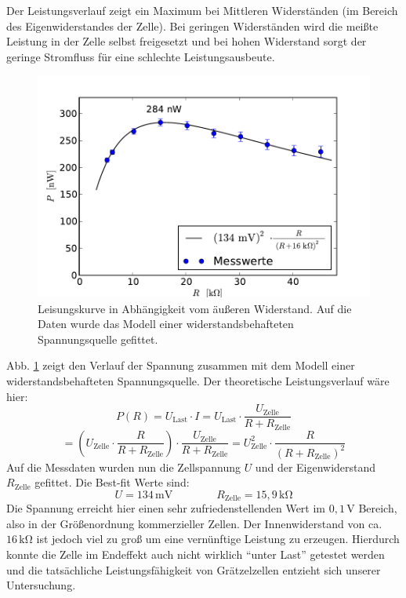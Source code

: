 \documentclass[11pt]{scrartcl}
\newcommand{\unit}[1]{\ensuremath{\,\mathrm{#1}}} %
\begin{document}
Der Leistungsverlauf zeigt ein Maximum bei Mittleren Widerständen (im Bereich des Eigenwiderstandes der Zelle). Bei geringen Widerständen wird die meißte Leistung in der Zelle selbst freigesetzt und bei hohen Widerstand sorgt der geringe Stromfluss für eine schlechte Leistungsausbeute.
\begin{figure}[ht]
\begin{center}
\includegraphics[width=1.0\textwidth]{images/graetzel_leistung.pdf}
\end{center}
\vspace{-1.5\baselineskip}
\caption{Leisungskurve in Abhängigkeit vom äußeren Widerstand. Auf die Daten wurde das Modell einer widerstandsbehafteten Spannungsquelle gefittet.}
\label{leistungskurve}
\end{figure}
Abb. \ref{leistungskurve} zeigt den Verlauf der Spannung zusammen mit dem Modell einer widerstandsbehafteten Spannungsquelle. Der theoretische Leistungsverlauf wäre hier:
\[
P(R)= U_{\text{Last}}\cdot I
= U_{\text{Last}}\cdot \frac{U_{\text{Zelle}}}{R+R_{\text{Zelle}}}
\]
\[
= \left(U_{\text{Zelle}}\cdot \frac{R}{R+R_{\text{Zelle}}}\right)\cdot \frac{U_{\text{Zelle}}}{R+R_{\text{Zelle}}}
= U_{\text{Zelle}}^2\cdot \frac{R}{(R+R_{\text{Zelle}})^2}
\]
Auf die Messdaten wurden nun die Zellspannung $U$ und der Eigenwiderstand $R_{\text{Zelle}}$ gefittet. Die Best-fit Werte sind:
\[
U = 134\unit{mV}
\qquad\qquad
R_{\text{Zelle}} = 15,9\unit{k\Omega}
\]
Die Spannung erreicht hier einen sehr zufriedenstellenden Wert im $0,1\unit{V}$ Bereich, also in der Größenordnung kommerzieller Zellen. Der Innenwiderstand von ca. $16\unit{k\Omega}$ ist jedoch viel zu groß um eine vernünftige Leistung zu erzeugen. Hierdurch konnte die Zelle im Endeffekt auch nicht wirklich "`unter Last"' getestet werden und die tatsächliche Leistungsfähigkeit von Grätzelzellen entzieht sich unserer Untersuchung.
\end{document}
